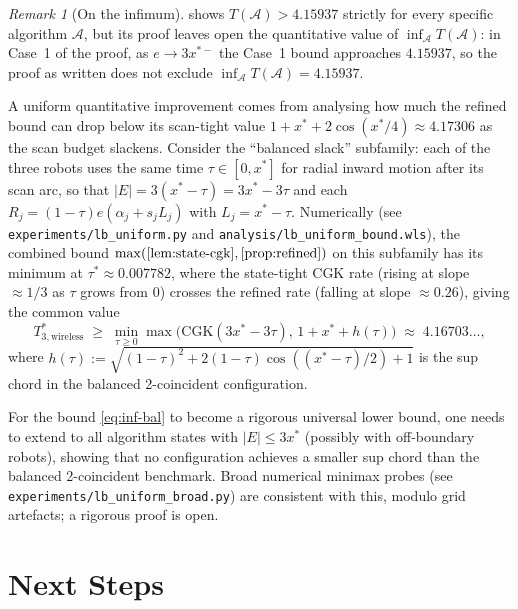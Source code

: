 \documentclass[11pt]{article}
\theoremstyle{plain}
\theoremstyle{definition}
\theoremstyle{remark}
\newtheorem{remark}[theorem]{Remark}
\begin{document}
\begin{remark}[On the infimum]
\label{rem:infimum-open}
 shows $T(\mathcal A) > 4.15937$ strictly for every
specific algorithm $\mathcal A$, but its proof leaves open the
quantitative value of $\inf_{\mathcal A} T(\mathcal A)$: in Case~1 of
the proof, as $e \to 3x^{*-}$ the Case~1 bound approaches $4.15937$, so
the proof as written does not exclude $\inf_{\mathcal A} T(\mathcal A) =
4.15937$.

A uniform quantitative improvement comes from analysing how much the
refined bound can drop below its scan-tight value $1 + x^* + 2\cos(x^*/4)
\approx 4.17306$ as the scan budget slackens. Consider the ``balanced
slack'' subfamily: each of the three robots uses the same time
$\tau \in [0, x^*]$ for radial inward motion after its scan arc, so
that $|E| = 3(x^* - \tau) = 3x^* - 3\tau$ and each $R_j = (1-\tau)e
(\alpha_j + s_j L_j)$ with $L_j = x^* - \tau$. Numerically (see
\texttt{experiments/lb\_uniform.py} and
\texttt{analysis/lb\_uniform\_bound.wls}), the combined bound
$\max(\text{\Cref{lem:state-cgk}},\text{\Cref{prop:refined}})$ on this
subfamily has its minimum at
$\tau^* \approx 0.007782$, where the state-tight CGK rate (rising at
slope $\approx 1/3$ as $\tau$ grows from $0$) crosses the refined rate
(falling at slope $\approx 0.26$), giving the common value
\begin{equation}
\label{eq:inf-bal}
T^*_{3,\mathrm{wireless}} \;\ge\; \min_{\tau \ge 0} \max\!\bigl(
\mathrm{CGK}(3x^* - 3\tau),\, 1 + x^* + h(\tau)\bigr)
\;\approx\; 4.16703\ldots,
\end{equation}
where $h(\tau) := \sqrt{(1-\tau)^2 + 2(1-\tau)\cos((x^*-\tau)/2) + 1}$
is the sup chord in the balanced 2-coincident configuration.

For the bound \eqref{eq:inf-bal} to become a rigorous universal
lower bound, one needs to extend  to all algorithm
states with $|E| \le 3x^*$ (possibly with off-boundary robots), showing
that no configuration achieves a smaller sup chord than the balanced
2-coincident benchmark. Broad numerical minimax probes (see
\texttt{experiments/lb\_uniform\_broad.py}) are consistent with this,
modulo grid artefacts; a rigorous proof is open.
\end{remark}

\section{Next Steps}
\label{sec:next}
\end{document}
